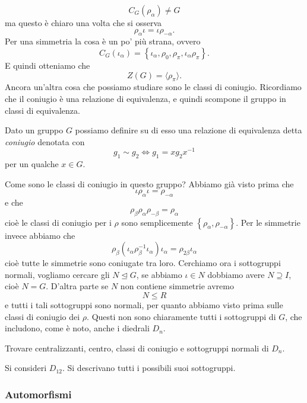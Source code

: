 \documentclass[11pt]{scrartcl}
\newcommand{\normal}{\mathrel{\unlhd}}
\begin{document}
	$$C_G(\rho_\alpha)\ne G$$
	ma questo è chiaro una volta che si osserva
	$$\rho_\alpha \iota = \iota \rho_{-\alpha}.$$
	Per una simmetria la cosa è un po' più strana, ovvero
	$$C_G(\iota_\alpha)=\left\{\iota_\alpha,\rho_0,\rho_\pi,\iota_\alpha\rho_\pi\right\}.$$
	E quindi otteniamo che 
	$$Z(G)=\langle \rho_\pi\rangle.$$
	Ancora un'altra cosa che possiamo studiare sono le classi di coniugio. Ricordiamo che il coniugio è una relazione di equivalenza, e quindi scompone il gruppo in classi di equivalenza.
	\begin{definition}[Coniugio]
		Dato un gruppo $G$ possiamo definire su di esso una relazione di equivalenza detta \textit{coniugio} denotata con 
		$$g_1\sim g_2 \iff g_1=xg_2x^{-1}$$
		per un qualche $x\in G$.
	\end{definition}
	Come sono le classi di coniugio in questo gruppo? Abbiamo già visto prima che
	$$\iota \rho_\alpha \iota = \rho_{-\alpha}$$
	e che
	$$\rho_\beta \rho_\alpha \rho_{-\beta}=\rho_\alpha$$
	cioè le classi di coniugio per i $\rho$ sono semplicemente $\left\{\rho_\alpha,\rho_{-\alpha}\right\}$. Per le simmetrie invece abbiamo che
	$$\rho_\beta\left(\iota_\alpha\rho_\beta^{-1}\iota_\alpha\right)\iota_\alpha=\rho_{2\beta}\iota_\alpha$$
	cioè tutte le simmetrie sono coniugate tra loro. Cerchiamo ora i sottogruppi normali, vogliamo cercare gli $N\normal G$, se abbiamo $\iota\in N$ dobbiamo avere $N\supseteq I$, cioè $N=G$. D'altra parte se $N$ non contiene simmetrie avremo
	$$N\le R$$
	e tutti i tali sottogruppi sono normali, per quanto abbiamo visto prima sulle classi di coniugio dei $\rho$. Questi non sono chiaramente tutti i sottogruppi di $G$, che includono, come è noto, anche i diedrali $D_n$.
	\begin{exercise}
		Trovare centralizzanti, centro, classi di coniugio e sottogruppi normali di $D_n$.
	\end{exercise}
	\begin{exercise}
		Si consideri $D_{12}$. Si descrivano tutti i possibili suoi sottogruppi.
	\end{exercise}
	\subsubsection{Automorfismi}
	 
\end{document}
